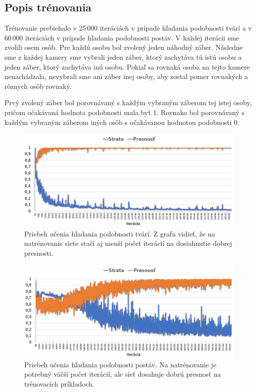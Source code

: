 \subsection{Popis trénovania}
Trénovanie prebiehalo v 25\,000 iteráciách v prípade hľadania podobnosti tvárí a v 60\,000 iteráciách v prípade hľadania podobnosti postáv.
V každej iterácii sme zvolili osem osôb.
Pre každú osobu bol zvolený jeden náhodný záber.
Následne sme z každej kamery sme vybrali jeden záber, ktorý zachytáva tú istú osobu a jeden záber, ktorý zachytáva inú osobu.
Pokiaľ sa rovnaká osoba na tejto kamere nenachádzala, nevybrali sme ani záber inej osoby, aby zostal pomer rovnakých a rôznych osôb rovnaký.

Prvý zvolený záber bol porovnávaný s každým vybraným záberom tej istej osoby, pričom očakávaná hodnota podobnosti mala byť 1.
Rovnako bol porovnávaný s každým vybraným záberom iných osôb s očakávanou hodnotou podobnosti 0.

\begin{figure}[H]
\centerline{\includegraphics[width=1\textwidth]{images/graph_learn_face.png}}
\caption[Priebeh učenia hľadania podobnosti tvárí]{Priebeh učenia hľadania podobnosti tvárí. Z grafu vidieť, že na natrénovanie siete stačí aj menší počet iterácií na dosiahnutie dobrej presnosti.}
\label{obr:graph_learn_face}
\end{figure}

\begin{figure}[H]
\centerline{\includegraphics[width=1\textwidth]{images/graph_learn_body.png}}
\caption[Priebeh učenia hľadania podobnosti postáv]{Priebeh učenia hľadania podobnosti postáv. Na natrénovanie je potrebný väčší počet iterácií, ale sieť dosahuje dobrú presnosť na trénovacích príkladoch.}
\label{obr:graph_learn_body}
\end{figure}


